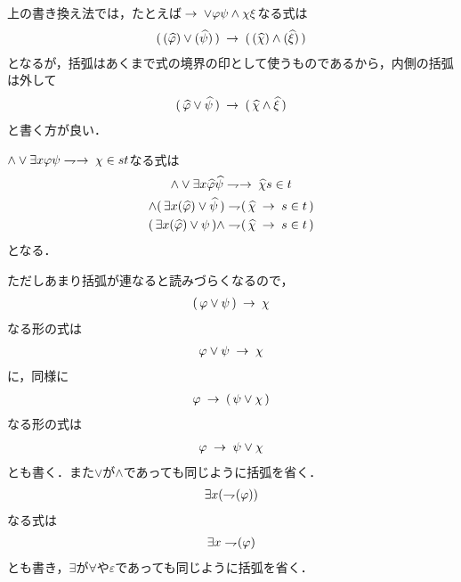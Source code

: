	上の書き換え法では，たとえば$\hspace{0.25em}\rightarrow\hspace{0.25em} \vee \varphi \psi \wedge \chi \xi$なる式は
	\begin{align}
		(\, (\widehat{\varphi}) \vee (\widehat{\psi})\, ) 
		\hspace{0.25em}\rightarrow\hspace{0.25em} (\, (\widehat{\chi}) \wedge (\widehat{\xi})\, )
	\end{align}
	となるが，括弧はあくまで式の境界の印として使うものであるから，内側の括弧は外して
	\begin{align}
		(\, \widehat{\varphi} \vee \widehat{\psi}\, ) 
		\hspace{0.25em}\rightarrow\hspace{0.25em} (\, \widehat{\chi} \wedge \widehat{\xi}\, )
	\end{align}
	と書く方が良い．
	
	$\wedge \vee \exists x \varphi \psi \negation \rarrow \chi \in s t$なる式は
	\begin{align}
		\begin{gathered}
			\wedge \vee \exists x \widehat{\varphi} \widehat{\psi} \negation \rarrow \widehat{\chi} s \in t \\
			\wedge (\, \exists x (\widehat{\varphi}) \vee \widehat{\psi}\, ) \negation (\, \widehat{\chi} \rarrow s \in t\, ) \\
			(\, \exists x (\widehat{\varphi}) \vee \psi\, ) \wedge \negation (\, \widehat{\chi} \rarrow s \in t\, )
		\end{gathered}
	\end{align}
	となる．
	
	ただしあまり括弧が連なると読みづらくなるので，
	\begin{align}
		(\, \varphi \vee \psi\, ) \hspace{0.25em}\rightarrow\hspace{0.25em} \chi
	\end{align}
	なる形の式は
	\begin{align}
		\varphi \vee \psi \hspace{0.25em}\rightarrow\hspace{0.25em} \chi
	\end{align}
	に，同様に
	\begin{align}
		\varphi \hspace{0.25em}\rightarrow\hspace{0.25em} (\, \psi \vee \chi\, )
	\end{align}
	なる形の式は
	\begin{align}
		\varphi \hspace{0.25em}\rightarrow\hspace{0.25em} \psi \vee \chi
	\end{align}
	とも書く．また$\vee$が$\wedge$であっても同じように括弧を省く．
	\begin{align}
		\exists x (\rightharpoondown\hspace{-0.25em} (\varphi))
	\end{align}
	なる式は
	\begin{align}
		\exists x \rightharpoondown\hspace{-0.25em} (\varphi)
	\end{align}
	とも書き，$\exists$が$\forall$や$\varepsilon$であっても同じように括弧を省く．